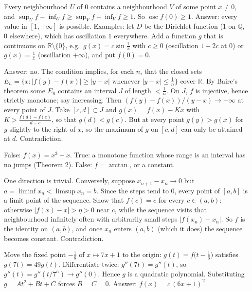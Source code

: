 \documentclass[11pt,a4paper]{article}
\begin{document}

 Every neighbourhood $U$ of $0$ contains a neighbourhood $V$ of some point $x\ne0$, and $\sup_Uf-\inf_Uf\ge\sup_Vf-\inf_Vf\ge1$. So $\operatorname{osc}f(0)\ge1$. Answer: every value in $[1,+\infty]$ is possible.
 Examples: let $D$ be the Dirichlet function ($1$ on $\mathbb Q$, $0$ elsewhere), which has oscillation $1$ everywhere. Add a function $g$ that is continuous on $\mathbb R\setminus\{0\}$, e.g.\ $g(x)=c\sin\frac1x$ with $c\ge0$ (oscillation $1+2c$ at $0$) or $g(x)=\frac1x$ (oscillation $+\infty$), and put $f(0)=0$.

 Answer: no. The condition implies, for each $n$, that the closed sets $E_n=\{x:|f(y)-f(x)|\ge|y-x|\text{ whenever }|y-x|\le\frac1n\}$ cover $\mathbb R$.
 By Baire's theorem some $E_n$ contains an interval $J$ of length $<\frac1n$. On $J$, $f$ is injective, hence strictly monotone; say increasing. Then $(f(y)-f(x))/(y-x)\to+\infty$ at every point of $J$.
 Take $[c,d]\subset J$ and $g(x)=f(x)-Kx$ with $K>\frac{f(d)-f(c)}{d-c}$, so that $g(d)<g(c)$. But at every point $g(y)>g(x)$ for $y$ slightly to the right of $x$, so the maximum of $g$ on $[c,d]$ can only be attained at $d$. Contradiction.

 False: $f(x)=x^3-x$.
 True: a monotone function whose range is an interval has no jumps (Theorem 2).
 False: $f=\arctan$, or a constant.

 One direction is trivial. Conversely, suppose $x_{n+1}-x_n\to0$ but $a=\liminf x_n<\limsup x_n=b$. Since the steps tend to $0$, every point of $[a,b]$ is a limit point of the sequence.
 Show that $f(c)=c$ for every $c\in(a,b)$: otherwise $|f(x)-x|>\eta>0$ near $c$, while the sequence visits that neighbourhood infinitely often with arbitrarily small steps $|f(x_n)-x_n|$.
 So $f$ is the identity on $(a,b)$, and once $x_n$ enters $(a,b)$ (which it does) the sequence becomes constant. Contradiction.

 Move the fixed point $-\frac16$ of $x\mapsto7x+1$ to the origin: $g(t)=f\bigl(t-\frac16\bigr)$ satisfies $g(7t)=49g(t)$.
 Differentiate twice: $g''(7t)=g''(t)$, so $g''(t)=g''(t/7^n)\to g''(0)$. Hence $g$ is a quadratic polynomial.
 Substituting $g=At^2+Bt+C$ forces $B=C=0$. Answer: $f(x)=c\,(6x+1)^2$.
\end{document}

